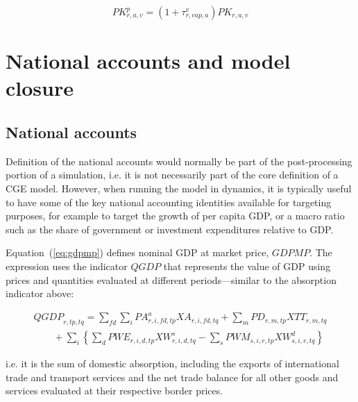 \documentclass[11pt,letterpaper]{report}
\begin{document}
\begin{equation}
\label{eq:pkp}
\mathit{PK}^p_{r,a,v} =
   \left( 1 + \tau^v_{r,\mathit{cap},a} \right) \mathit{PK}_{r,a,v}
\end{equation}

\section{National accounts and model closure}
\renewcommand{\theequation}{{M-}\arabic{equation}}
\setcounter{equation}{0}

\subsection{National accounts}

Definition of the national accounts would normally be part of the
post-processing portion of a simulation, i.e. it is not necessarily part of the
core definition of a CGE model. However, when running the model in dynamics, it
is typically useful to have some of the key national accounting identities
available for targeting purposes, for example to target the growth of per capita
GDP, or a macro ratio such as the share of government or investment expenditures
relative to GDP.

Equation~(\ref{eq:gdpmp}) defines nominal GDP at market price, $\mathit{GDPMP}$.
The expression uses the indicator $\mathit{QGDP}$ that represents the value of
GDP using prices and quantities evaluated at different periods---similar to the
absorption indicator above:

\[
\begin{array}{*{20}{l}}
\displaystyle \mathit{QGDP}_{r,\mathit{tp},\mathit{tq}} =
   \sum_{\mathit{fd}} { \sum_i{
      \mathit{PA}^a_{r,i,\mathit{fd},\mathit{tp}}
      \mathit{XA}_{r,i,\mathit{fd},\mathit{tq}}
   }}
+  \sum_m {
      \mathit{PD_{r,m,\mathit{tp}}} \mathit{XTT_{r,m,\mathit{tq}}}
   } \\
\qquad + \displaystyle
   \sum_i {
      \left\{\sum_d {
         \mathit{PWE_{r,i,d,\mathit{tp}}} \mathit{XW}^s_{r,i,d,\mathit{tq}}
      }
      - \sum_s {
         \mathit{PWM_{s,i,r,\mathit{tp}}} \mathit{XW}^d_{s,i,r,\mathit{tq}}
      }
      \right\}}
\end{array}
\]

\noindent i.e. it is the sum of domestic absorption, including the exports of
international trade and transport services and the net trade balance for all
other goods and services evaluated at their respective border prices.
\end{document}
